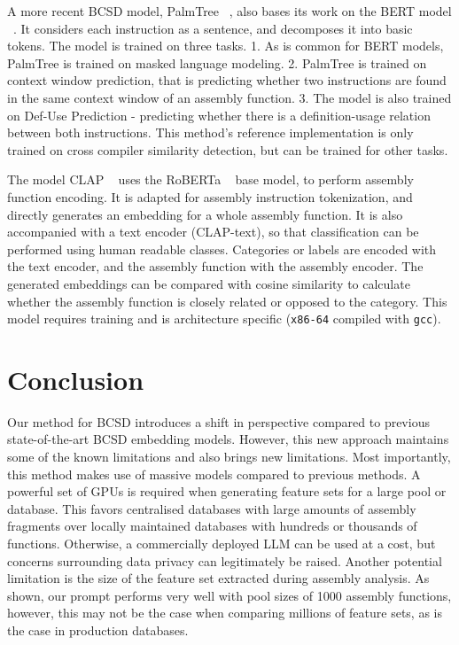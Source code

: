 \documentclass[conference,compsoc]{IEEEtran}
\begin{document}
A more recent BCSD model, PalmTree ~\cite{PalmTree}, also bases its work on the BERT model ~\cite{BERT}.
It considers each instruction as a sentence, and decomposes it into basic tokens. The model is trained
on three tasks. 1. As is common for BERT models, PalmTree is trained on masked language modeling. 2.
PalmTree is trained on context window prediction, that is predicting whether two instructions are found
in the same context window of an assembly function. 3. The model is also trained on Def-Use Prediction -
predicting whether there is a definition-usage relation between both instructions. This method's
reference implementation is only trained on cross compiler similarity detection, but can be trained
for other tasks.

The model CLAP ~\cite{CLAP} uses the RoBERTa ~\cite{RoBERTa} base model, to perform assembly function encoding.
It is adapted for assembly instruction tokenization, and directly generates an embedding for
a whole assembly function. It is also accompanied with a text encoder (CLAP-text), so that classification can
be performed using human readable classes. Categories or labels are encoded with the text encoder, and the
assembly function with the assembly encoder. The generated embeddings can be compared with cosine similarity to
calculate whether the assembly function is closely related or opposed to the category. This model requires
training and is architecture specific (\texttt{x86-64} compiled with \texttt{gcc}).

\section{Conclusion}

Our method for BCSD introduces a shift in perspective compared to previous state-of-the-art BCSD embedding models. However,
this new approach maintains some of the known limitations and also brings new limitations. Most importantly, this
method makes use of massive models compared to previous methods. A powerful set of GPUs is required when generating
feature sets for a large pool or database. This favors centralised databases with large amounts of assembly fragments over
locally maintained databases with hundreds or thousands of functions. Otherwise, a commercially deployed LLM can be used at a
cost, but concerns surrounding data privacy can legitimately be raised. Another potential limitation is the size of the feature
set extracted during assembly analysis. As shown, our prompt performs very well with pool sizes of 1000 assembly functions,
however, this may not be the case when comparing millions of feature sets, as is the case in production databases.
\end{document}
